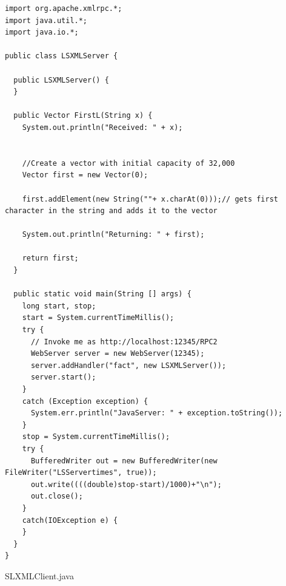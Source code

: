 \documentclass{article}
\begin{document}
\begin{lstlisting}
import org.apache.xmlrpc.*;
import java.util.*;
import java.io.*;

public class LSXMLServer {

  public LSXMLServer() {
  }

  public Vector FirstL(String x) {
    System.out.println("Received: " + x);


    //Create a vector with initial capacity of 32,000
    Vector first = new Vector(0);

    first.addElement(new String(""+ x.charAt(0)));// gets first character in the string and adds it to the vector

    System.out.println("Returning: " + first);

    return first;
  }

  public static void main(String [] args) {
    long start, stop;
    start = System.currentTimeMillis();
    try {
      // Invoke me as http://localhost:12345/RPC2
      WebServer server = new WebServer(12345);
      server.addHandler("fact", new LSXMLServer());
      server.start();
    }
    catch (Exception exception) {
      System.err.println("JavaServer: " + exception.toString());
    }
    stop = System.currentTimeMillis();
    try {
      BufferedWriter out = new BufferedWriter(new FileWriter("LSServertimes", true));
      out.write((((double)stop-start)/1000)+"\n");
      out.close();
    }
    catch(IOException e) {
    }
  }
}

\end{lstlisting}

SLXMLClient.java
\end{document}
